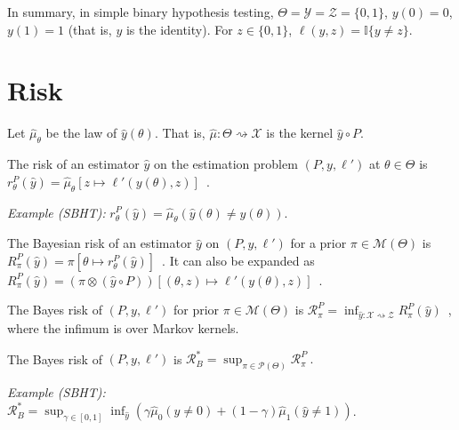 In summary, in simple binary hypothesis testing, $\Theta = \mathcal Y = \mathcal Z = \{0,1\}$, $y(0) = 0$, $y(1) = 1$ (that is, $y$ is the identity). For $z \in \{0,1\}$, $\ell(y, z) = \mathbb{I}\{y \ne z\}$.

\section{Risk}

Let $\hat{\mu}_\theta$ be the law of $\hat{y}(\theta)$. That is, $\hat{\mu} : \mathcal \Theta \rightsquigarrow \mathcal X$ is the kernel $\hat{y} \circ P$.

\begin{definition}[Risk]
  \label{def:risk}
  \leanok
  The risk of an estimator $\hat{y}$ on the estimation problem $(P, y, \ell')$ at $\theta \in \Theta$ is $r^P_\theta(\hat{y}) = \hat{\mu}_\theta\left[z \mapsto \ell'(y(\theta), z)\right]$~.
\end{definition}

\emph{Example (SBHT):} $r^P_\theta(\hat{y}) = \hat{\mu}_\theta(\hat{y}(\theta) \ne y(\theta))$.


\begin{definition}
  \label{def:bayesianRisk}
  \leanok
  The Bayesian risk of an estimator $\hat{y}$ on $(P, y, \ell')$ for a prior $\pi \in \mathcal M(\Theta)$ is $R^P_\pi(\hat{y}) = \pi\left[\theta \mapsto r^P_\theta(\hat{y})\right]$~. It can also be expanded as $R^P_\pi(\hat{y}) = (\pi \otimes (\hat{y} \circ P))\left[ (\theta, z) \mapsto \ell'(y(\theta), z) \right]$~.
\end{definition}


\begin{definition}
  \label{def:bayesRisk}
  \leanok
  The Bayes risk of $(P, y, \ell')$ for prior $\pi \in \mathcal M(\Theta)$ is $\mathcal R^P_\pi = \inf_{\hat{y} : \mathcal X \rightsquigarrow \mathcal Z} R^P_\pi(\hat{y})$~, where the infimum is over Markov kernels.

  The Bayes risk of $(P, y, \ell')$ is $\mathcal R^*_B = \sup_{\pi \in \mathcal P(\Theta)} \mathcal R^P_\pi \: .$
\end{definition}

\emph{Example (SBHT):} $\mathcal R^*_B = \sup_{\gamma \in [0,1]}\inf_{\hat{y}}\left(\gamma \hat{\mu}_0(\hat{y} \ne 0) + (1 - \gamma) \hat{\mu}_1(\hat{y} \ne 1)\right)$.

